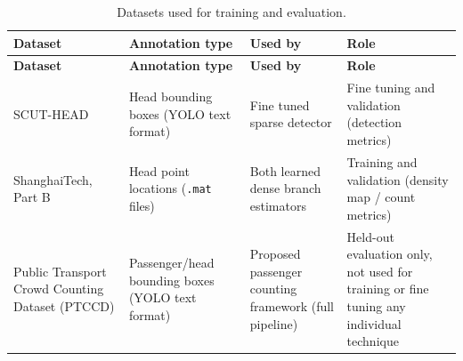 \begin{longtable}{|
    >{\raggedright\arraybackslash}p{}|
    >{\raggedright\arraybackslash}p{}|
    >{\raggedright\arraybackslash}p{}|
    >{\raggedright\arraybackslash}p{}|
}
\caption{Datasets used for training and evaluation.}
\label{tab:datasets}\\
\hline
\textbf{Dataset} &
\textbf{Annotation type} &
\textbf{Used by} &
\textbf{Role} \\
\hline
\endfirsthead

\hline
\textbf{Dataset} &
\textbf{Annotation type} &
\textbf{Used by} &
\textbf{Role} \\
\hline
\endhead

\hline
\endfoot

\hline
\endlastfoot

SCUT-HEAD~\cite{peng2018scuthead} &
Head bounding boxes (YOLO text format) &
Fine tuned sparse detector &
Fine tuning and validation (detection metrics) \\
\hline

ShanghaiTech, Part B~\cite{Zhu2020} &
Head point locations (\texttt{.mat} files) &
Both learned dense branch estimators &
Training and validation (density map / count metrics) \\
\hline

Public Transport Crowd Counting Dataset (PTCCD) &
Passenger/head bounding boxes (YOLO text format) &
Proposed passenger counting framework (full pipeline) &
Held-out evaluation only, not used for training or fine tuning any individual technique \\
\hline

\end{longtable}

